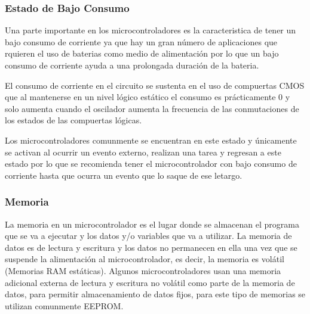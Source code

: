 \documentclass[letterpaper,12pt,oneside]{book}
\begin{document}
				\subsubsection{Estado de Bajo Consumo}
				Una parte importante en los microcontroladores es la caracteristica de tener un bajo consumo de corriente ya que hay un gran número de aplicaciones que rquieren el uso de baterias como medio de alimentación por lo que un bajo consumo de corriente ayuda a una prolongada duración de la bateria.

				El consumo de corriente en el circuito se sustenta en el uso de compuertas CMOS que al mantenerse en un nivel lógico estático el consumo es prácticamente 0 y solo aumenta cuando el oscilador aumenta la frecuencia de las conmutaciones de los estados de las compuertas lógicas.

				Los microcontroladores comunmente se encuentran en este estado y únicamente se activan al ocurrir un evento externo, realizan una tarea y regresan a este estado por lo que se recomienda tener el microcontrolador con bajo consumo de corriente hasta que ocurra un evento que lo saque de ese letargo.

				\subsubsection{Memoria}
				La memoria en un microcontrolador es el lugar donde se almacenan el programa que se va a ejecutar y los datos y/o variables que va a utilizar. La memoria de datos es de lectura y escritura y los datos no permanecen en ella una vez que se suspende la alimentación al microcontrolador, es decir, la memoria es volátil (Memorias RAM estáticas). Algunos microcontroladores usan una memoria adicional externa de lectura y escritura no volátil como parte de la memoria de datos, para permitir almacenamiento de datos fijos, para este tipo de memorias se utilizan comunmente EEPROM.
\end{document}
